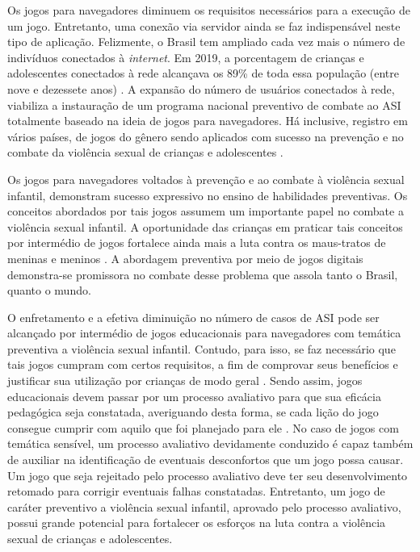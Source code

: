 Os jogos para navegadores diminuem os requisitos necessários para a execução de um jogo. Entretanto, uma conexão via servidor ainda se faz indispensável neste tipo de aplicação. Felizmente, o Brasil tem ampliado cada vez mais o número de indivíduos conectados à \textit{internet}. Em 2019, a porcentagem de crianças e adolescentes conectados à rede alcançava os 89\% de toda essa população (entre nove e dezessete anos) \cite{nic2019pesquisa}. A expansão do número de usuários conectados à rede, viabiliza a instauração de um programa nacional preventivo de combate ao \ac{ASI} totalmente baseado na ideia de jogos para navegadores. Há inclusive, registro em vários países, de jogos do gênero sendo aplicados com sucesso na prevenção e no combate da violência sexual de crianças e adolescentes \cite{jones2008online, fingerle2018abschlussbericht}. 

Os jogos para navegadores voltados à prevenção e ao combate à violência sexual infantil, demonstram sucesso expressivo no ensino de habilidades preventivas. Os conceitos abordados por tais jogos assumem um importante papel no combate a violência sexual infantil. A oportunidade das crianças em praticar tais conceitos por intermédio de jogos fortalece ainda mais a luta contra os maus-tratos de meninas e meninos \cite{collin2013lessons}. A abordagem preventiva por meio de jogos digitais demonstra-se promissora no combate desse problema que assola tanto o Brasil, quanto o mundo. 

O enfretamento e a efetiva diminuição no número de casos de \ac{ASI} pode ser alcançado por intermédio de jogos educacionais para navegadores com temática preventiva a violência sexual infantil. Contudo, para isso, se faz necessário que tais jogos cumpram com certos requisitos, a fim de comprovar seus benefícios e justificar sua utilização por crianças de modo geral \cite{campos1996dez}. Sendo assim, jogos educacionais devem passar por um processo avaliativo para que sua eficácia pedagógica seja constatada, averiguando desta forma, se cada lição do jogo consegue cumprir com aquilo que foi planejado para ele \cite{montilva2002method, padron2007towards}. No caso de jogos com temática sensível, um processo avaliativo devidamente conduzido é capaz também de auxiliar na identificação de eventuais desconfortos que um jogo possa causar. Um jogo que seja rejeitado pelo processo avaliativo deve ter seu desenvolvimento retomado para corrigir eventuais falhas constatadas. Entretanto, um jogo de caráter preventivo a violência sexual infantil, aprovado pelo processo avaliativo, possui grande potencial para fortalecer os esforços na luta contra a violência sexual de crianças e adolescentes. 


